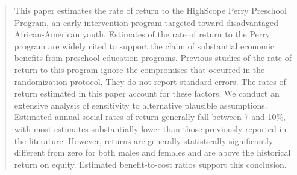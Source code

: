 
\maketitle

 \begin{frame}
\begin{quote}\small
This paper estimates the rate of return to the HighScope Perry Preschool Program, an early intervention
program targeted toward disadvantaged African-American youth. Estimates of the rate of return to the Perry
program are widely cited to support the claim of substantial economic benefits from preschool education
programs. Previous studies of the rate of return to this program ignore the compromises that occurred in the
randomization protocol. They do not report standard errors. The rates of return estimated in this paper
account for these factors. We conduct an extensive analysis of sensitivity to alternative plausible
assumptions. Estimated annual social rates of return generally fall between 7 and 10\%, with most estimates
substantially lower than those previously reported in the literature. However, returns are generally
statistically significantly different from zero for both males and females and are above the historical return
on equity. Estimated benefit-to-cost ratios support this conclusion.
\end{quote}
 \end{frame}
